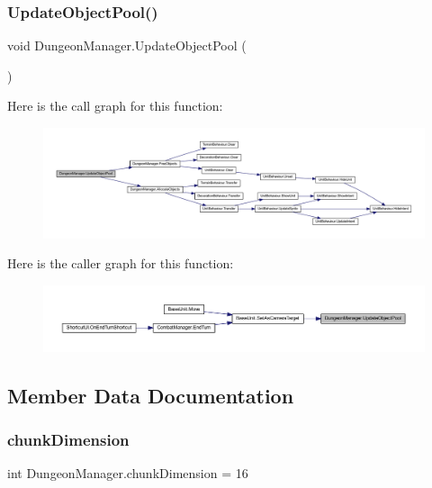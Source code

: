 \subsubsection{\texorpdfstring{UpdateObjectPool()}{UpdateObjectPool()}}
{\footnotesize\ttfamily void Dungeon\+Manager.\+Update\+Object\+Pool (\begin{DoxyParamCaption}{ }\end{DoxyParamCaption})}

Here is the call graph for this function\+:\nopagebreak
\begin{figure}[H]
\begin{center}
\leavevmode
\includegraphics[width=350pt]{class_dungeon_manager_a980762c66ae4ae92ce3d8caa42f7fe61_cgraph}
\end{center}
\end{figure}
Here is the caller graph for this function\+:\nopagebreak
\begin{figure}[H]
\begin{center}
\leavevmode
\includegraphics[width=350pt]{class_dungeon_manager_a980762c66ae4ae92ce3d8caa42f7fe61_icgraph}
\end{center}
\end{figure}


\subsection{Member Data Documentation}
\mbox{\label{class_dungeon_manager_a36a67a913c6a4b58b2f32094c23df9e2}} 
\subsubsection{\texorpdfstring{chunkDimension}{chunkDimension}}
{\footnotesize\ttfamily int Dungeon\+Manager.\+chunk\+Dimension = 16\hspace{0.3cm}{\ttfamily [static]}}

